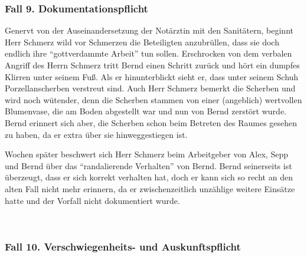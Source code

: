 \subsubsection{Fall 9. Dokumentationspflicht}
\label{topic:jus-langer-dienst-fall-9}
\label{topic:dokumentationspflicht-fallbeispiel}


{Genervt von der Auseinandersetzung der Notärztin mit den
Sanitätern, beginnt Herr Schmerz wild vor Schmerzen die
Beteiligten anzubrüllen, dass sie doch endlich ihre
\enquote{gottverdammte Arbeit} tun sollen.
Erschrocken von dem verbalen Angriff des Herrn Schmerz tritt
Bernd einen Schritt zurück und hört ein dumpfes Klirren
unter seinem Fuß. Als er hinunterblickt sieht er, dass unter
seinem Schuh Porzellanscherben verstreut sind. Auch Herr
Schmerz bemerkt die Scherben und wird noch wütender, denn
die Scherben stammen von einer (angeblich) wertvollen
Blumenvase, die am Boden abgestellt war und nun von Bernd
zerstört wurde. Bernd erinnert sich aber, die Scherben schon
beim Betreten des Raumes gesehen zu haben, da er extra über
sie hinweggestiegen ist.

Wochen später beschwert sich Herr Schmerz beim
Arbeitgeber von Alex, Sepp und Bernd über das
\enquote{randalierende Verhalten} von Bernd. Bernd seinerseits ist
überzeugt, dass er sich korrekt verhalten hat, doch er kann sich so recht an den alten Fall nicht mehr
erinnern, da er zwischenzeitlich unzählige weitere
Einsätze hatte und der Vorfall nicht dokumentiert
wurde.}{}{}{}{}




~


\subsubsection{Fall 10. Verschwiegenheits- und Auskunftspflicht}
\label{topic:jus-langer-dienst-fall-10}




